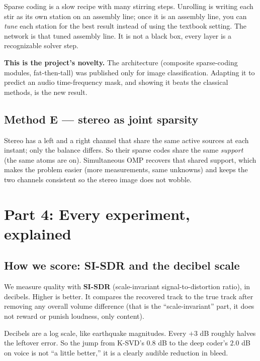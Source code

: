 \documentclass[11pt]{article}
\begin{document}
\begin{analogy}
Sparse coding is a slow recipe with many stirring steps. Unrolling is writing each
stir as its own station on an assembly line; once it is an assembly line, you can
\emph{tune} each station for the best result instead of using the textbook setting.
The network is that tuned assembly line. It is not a black box, every layer is a
recognizable solver step.
\end{analogy}

\begin{keypoint}
\textbf{This is the project's novelty.} The architecture (composite sparse-coding
modules, fat-then-tall) was published only for image classification. Adapting it to
predict an audio time-frequency mask, and showing it beats the classical methods, is
the new result.
\end{keypoint}

\subsection{Method E --- stereo as joint sparsity}
Stereo has a left and a right channel that share the same active sources at each
instant; only the balance differs. So their sparse codes share the same
\emph{support} (the same atoms are on). Simultaneous OMP recovers that shared
support, which makes the problem easier (more measurements, same unknowns) and keeps
the two channels consistent so the stereo image does not wobble.

\section{Part 4: Every experiment, explained}

\subsection{How we score: SI-SDR and the decibel scale}
We measure quality with \textbf{SI-SDR} (scale-invariant signal-to-distortion
ratio), in decibels. Higher is better. It compares the recovered track to the true
track after removing any overall volume difference (that is the ``scale-invariant''
part, it does not reward or punish loudness, only content).

\begin{analogy}
Decibels are a log scale, like earthquake magnitudes. Every $+3$ dB roughly halves
the leftover error. So the jump from K-SVD's $0.8$ dB to the deep coder's $2.0$ dB
on voice is not ``a little better,'' it is a clearly audible reduction in bleed.
\end{analogy}
\end{document}
